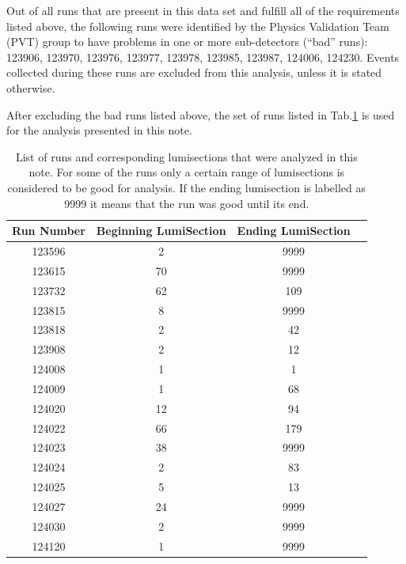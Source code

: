 Out of all runs that are present in this data set and fulfill all
of the requirements listed above, the following runs were identified 
by the Physics Validation Team (PVT) group to have
problems in one or more sub-detectors (``bad'' runs): 123906, 123970, 123976, 123977, 
123978, 123985, 123987, 124006, 124230. 
Events collected during these runs are excluded
from this analysis, unless it is stated otherwise.

After excluding the bad runs listed above, the set of runs listed in
Tab.\ref{tab:goodruns} is used for the analysis presented in this
note. 

\begin{table}[h]
  \begin{center}
    \begin{tabular}{|c|c|c|c|}
      \hline
      Run Number      & Beginning LumiSection  & Ending LumiSection   \\\hline\hline
      123596              & 2   & 9999\\ 
      123615              & 70 & 9999\\
      123732              & 62 & 109\\
      123815              & 8   & 9999\\
      123818              & 2   & 42\\
      123908              & 2   & 12\\
      124008              & 1   & 1\\
      124009              & 1   & 68\\
      124020              & 12 & 94\\
      124022              & 66 & 179\\
      124023              & 38 & 9999\\
      124024              & 2   & 83\\
      124025              & 5   & 13\\
      124027              & 24 & 9999\\
      124030              & 2   & 9999\\
      124120              & 1   & 9999\\
      \hline    
    \end{tabular}
    \caption{List of runs and corresponding lumisections that were analyzed in this note. For some of
      the runs only a certain range of lumisections is considered to be
      good for analysis. If the ending lumisection is labelled as 9999 it
      means that the run was good until its end.}
    \label{tab:goodruns}
  \end{center}
\end{table}


